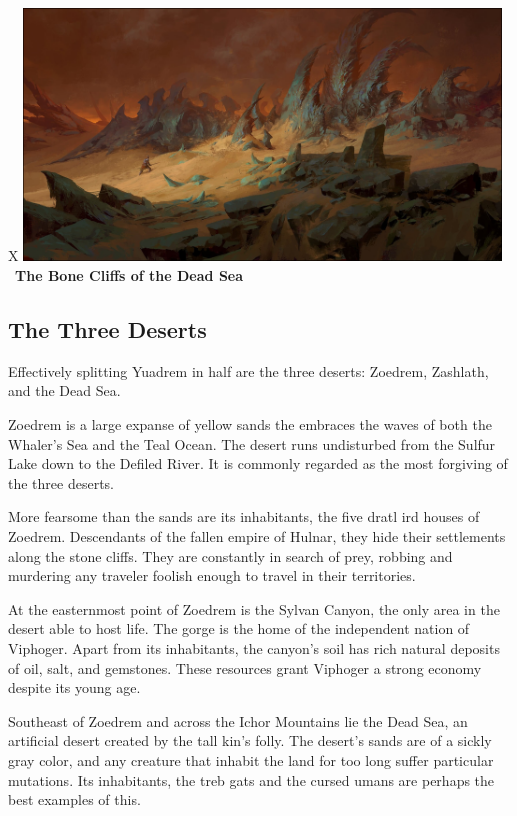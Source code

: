 
\begin{table}[b]%
    \begin{DndTable}[width=\linewidth]{X}
        \centering
        \includegraphics[width=0.95\textwidth]{01yuadrem/img/12dead_sea.png} \
        \centering \large{\textbf{The Bone Cliffs of the Dead Sea}}
    \end{DndTable}
\end{table}

\subsection*{The Three Deserts} \label{ssec::threedeserts}
Effectively splitting Yuadrem in half are the three deserts: Zoedrem, Zashlath, and the Dead Sea.

Zoedrem is a large expanse of yellow sands the embraces the waves of both the Whaler's Sea and the Teal Ocean.
The desert runs undisturbed from the Sulfur Lake down to the Defiled River.
It is commonly regarded as the most forgiving of the three deserts.

More fearsome than the sands are its inhabitants, the five dratl ird houses of Zoedrem.
Descendants of the fallen empire of Hulnar, they hide their settlements along the stone cliffs.
They are constantly in search of prey, robbing and murdering any traveler foolish enough to travel in their territories.

At the easternmost point of Zoedrem is the Sylvan Canyon, the only area in the desert able to host life.
The gorge is the home of the independent nation of Viphoger.
Apart from its inhabitants, the canyon's soil has rich natural deposits of oil, salt, and gemstones.
These resources grant Viphoger a strong economy despite its young age.

Southeast of Zoedrem and across the Ichor Mountains lie the Dead Sea, an artificial desert created by the tall kin's folly.
The desert's sands are of a sickly gray color, and any creature that inhabit the land for too long suffer particular mutations.
Its inhabitants, the treb gats and the cursed umans are perhaps the best examples of this.

